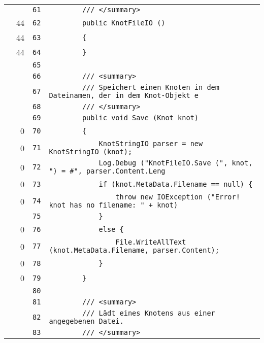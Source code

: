 \documentclass[a4paper,10pt]{article}
\begin{document}
\begin{longtable}[l]{lrrl}
\cellcolor{gray} &  & \verb~61~ & \verb~        /// </summary>~\\
\cellcolor{green} & 44 & \verb~62~ & \verb~        public KnotFileIO ()~\\
\cellcolor{green} & 44 & \verb~63~ & \verb~        {~\\
\cellcolor{green} & 44 & \verb~64~ & \verb~        }~\\
\cellcolor{gray} &  & \verb~65~ & \verb~~\\
\cellcolor{gray} &  & \verb~66~ & \verb~        /// <summary>~\\
\cellcolor{gray} &  & \verb~67~ & \verb~        /// Speichert einen Knoten in dem Dateinamen, der in dem Knot-Objekt e~\\
\cellcolor{gray} &  & \verb~68~ & \verb~        /// </summary>~\\
\cellcolor{gray} &  & \verb~69~ & \verb~        public void Save (Knot knot)~\\
\cellcolor{red} & 0 & \verb~70~ & \verb~        {~\\
\cellcolor{red} & 0 & \verb~71~ & \verb~            KnotStringIO parser = new KnotStringIO (knot);~\\
\cellcolor{red} & 0 & \verb~72~ & \verb~            Log.Debug ("KnotFileIO.Save (", knot, ") = #", parser.Content.Leng~\\
\cellcolor{red} & 0 & \verb~73~ & \verb~            if (knot.MetaData.Filename == null) {~\\
\cellcolor{red} & 0 & \verb~74~ & \verb~                throw new IOException ("Error! knot has no filename: " + knot)~\\
\cellcolor{gray} &  & \verb~75~ & \verb~            }~\\
\cellcolor{red} & 0 & \verb~76~ & \verb~            else {~\\
\cellcolor{red} & 0 & \verb~77~ & \verb~                File.WriteAllText (knot.MetaData.Filename, parser.Content);~\\
\cellcolor{red} & 0 & \verb~78~ & \verb~            }~\\
\cellcolor{red} & 0 & \verb~79~ & \verb~        }~\\
\cellcolor{gray} &  & \verb~80~ & \verb~~\\
\cellcolor{gray} &  & \verb~81~ & \verb~        /// <summary>~\\
\cellcolor{gray} &  & \verb~82~ & \verb~        /// Lädt eines Knotens aus einer angegebenen Datei.~\\
\cellcolor{gray} &  & \verb~83~ & \verb~        /// </summary>~\\

\end{longtable}
\end{document}
